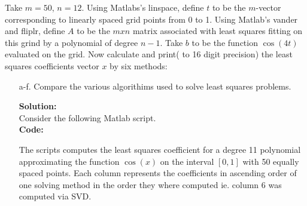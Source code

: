 \documentclass[12pt]{article}
\makeatletter
\theoremstyle{homework}
\newenvironment{exercise}[1]
{\def\@currentlabel{#1}\exercisecore}
{\endexercisecore}
\newcommand{\localhead}[1]{\par\smallskip\noindent\textbf{#1}\nobreak\\}%
\newcommand\solution{\localhead{Solution:}}
\makeatother
\begin{document}
\begin{exercise}{11.3} Take $m = 50$, $n = 12$. Using Matlabs's linspace, define $t$ to be the $m$-vector corresponding to linearly spaced 
  grid points from 0 to 1. Using Matlab's vander and fliplr, define $A$ to be the $mxn$ matrix associated with least squares fitting on this 
  grind by a polynomial of degree $n-1$. Take $b$ to be the function $\cos(4t)$ evaluated on the grid. Now calculate and print( to 16 digit
  precision) the least squares coefficients vector $x$ by six methods: 
  \begin{enumerate}
    \item[a-f.] Compare the various algorithims used to solve least squares problems.\\
    \solution Consider the following Matlab script.\\
    \textbf{Code:}
    \begin{center}
    
    \end{center} 
    \begin{center}
    
    \end{center} 
    The scripts computes the least squares coefficient for a degree 11 polynomial approximating the function 
    $\cos(x)$ on the interval $[0, 1]$ with 50 equally spaced points. Each column represents the coefficients in ascending order of one solving method
    in the order they where computed ie. column 6 was computed via SVD. \\
    \vspace{.15in}


\end{enumerate}
\end{exercise}
\end{document}

